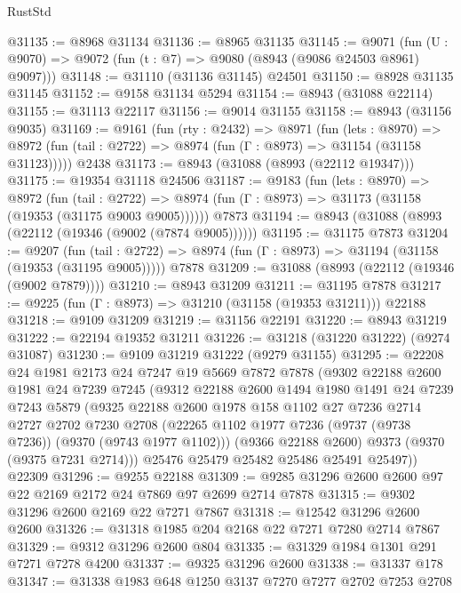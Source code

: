 \begin{lexlean}{RustStd}
\begin{coremodule}
{\begin{coremodule}
{{{{{{{{{{{{{{{{{{{{{{{{{{{{{{{{{{{{{{{@31135 := @8968 @31134
@31136 := @8965 @31135
@31145 := @9071
    (fun (U : @9070) => @9072 (fun (t : @7) => @9080 (@8943 (@9086 @24503 @8961) @9097)))
@31148 := @31110 (@31136 @31145) @24501
@31150 := @8928 @31135 @31145
@31152 := @9158 @31134 @5294
@31154 := @8943 (@31088 @22114)
@31155 := @31113 @22117
@31156 := @9014 @31155
@31158 := @8943 (@31156 @9035)
@31169 := @9161
    (fun (rty : @2432) =>
    @8971
      (fun (lets : @8970) =>
      @8972 (fun (tail : @2722) => @8974 (fun (Γ : @8973) => @31154 (@31158 @31123)))))
    @2438
@31173 := @8943 (@31088 (@8993 (@22112 @19347)))
@31175 := @19354 @31118 @24506
@31187 := @9183
    (fun (lets : @8970) =>
    @8972
      (fun (tail : @2722) =>
      @8974 (fun (Γ : @8973) => @31173 (@31158 (@19353 (@31175 @9003 @9005))))))
    @7873
@31194 := @8943 (@31088 (@8993 (@22112 (@19346 (@9002 (@7874 @9005))))))
@31195 := @31175 @7873
@31204 := @9207
    (fun (tail : @2722) => @8974 (fun (Γ : @8973) => @31194 (@31158 (@19353 (@31195 @9005)))))
    @7878
@31209 := @31088 (@8993 (@22112 (@19346 (@9002 @7879))))
@31210 := @8943 @31209
@31211 := @31195 @7878
@31217 := @9225 (fun (Γ : @8973) => @31210 (@31158 (@19353 @31211))) @22188
@31218 := @9109 @31209
@31219 := @31156 @22191
@31220 := @8943 @31219
@31222 := @22194 @19352 @31211
@31226 := @31218 (@31220 @31222) (@9274 @31087)
@31230 := @9109 @31219 @31222 (@9279 @31155)
@31295 := @22208
    @24
    @1981
    @2173
    @24
    @7247
    @19
    @5669
    @7872
    @7878
    (@9302
      @22188
      @2600
      @1981
      @24
      @7239
      @7245
      (@9312
        @22188
        @2600
        @1494
        @1980
        @1491
        @24
        @7239
        @7243
        @5879
        (@9325
          @22188
          @2600
          @1978
          @158
          @1102
          @27
          @7236
          @2714
          @2727
          @2702
          @7230
          @2708
          (@22265 @1102 @1977 @7236 (@9737 (@9738 @7236)) (@9370 (@9743 @1977 @1102)))
          (@9366 @22188 @2600)
          @9373
          (@9370 (@9375 @7231 @2714)))
        @25476
        @25479
        @25482
        @25486
        @25491
        @25497))
    @22309
@31296 := @9255 @22188
@31309 := @9285 @31296 @2600 @2600 @97 @22 @2169 @2172 @24 @7869 @97 @2699 @2714 @7878
@31315 := @9302 @31296 @2600 @2169 @22 @7271 @7867
@31318 := @12542 @31296 @2600 @2600
@31326 := @31318 @1985 @204 @2168 @22 @7271 @7280 @2714 @7867
@31329 := @9312 @31296 @2600 @804
@31335 := @31329 @1984 @1301 @291 @7271 @7278 @4200
@31337 := @9325 @31296 @2600
@31338 := @31337 @178
@31347 := @31338 @1983 @648 @1250 @3137 @7270 @7277 @2702 @7253 @2708
}}}}}}}}}}}}}}}}}}}}}}}}}}}}}}}}}}}}}}}
\end{coremodule}}
\end{coremodule}
\end{lexlean}
